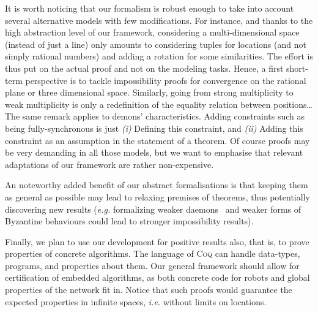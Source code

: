 \documentclass[11pt,a4]{llncs}
\newcommand{\x}{\xspace}
\newcommand{\coq}{\textsc{Coq}\x}
\begin{document}
It is worth noticing that our formalism is robust enough to take into
account several alternative models with few modifications.  For instance, and
thanks to the high abstraction level of our framework, considering a
multi-dimensional space (instead of just a line) only amounts to
considering tuples for locations (and not simply rational numbers) and
adding a rotation for some similarities. The effort is
thus put on the actual proof and not on the modeling tasks. Hence, a
first short-term perspective is to tackle impossibility proofs for convergence on
the rational plane or three dimensional space. Similarly, going from strong multiplicity to weak
multiplicity is only a redefinition of the equality relation between
positions\ldots The same remark applies to demons'
characteristics. Adding constraints such as being fully-synchronous is
just \emph{(i)} Defining this constraint, and \emph{(ii)} Adding this constraint as an
assumption in the statement of a theorem. Of course proofs may be very
demanding in all those models, but we want to emphasise that relevant
adaptations of our framework are rather non-expensive.

An noteworthy added benefit of our abstract formalisations is
that keeping them as general as possible may lead to relaxing premises
of theorems, thus potentially discovering new results (\emph{e.g.}
formalizing weaker daemons~\cite{DT11r} and weaker forms of Byzantine behaviours
could lead to stronger impossibility results).

Finally, we plan to use our development for positive results also,
that is, to prove properties of concrete algorithms. The language of
\coq can handle data-types, programs, and properties about them. Our
general framework should allow for certification of embedded
algorithms, as both concrete code for robots and global properties of
the network fit in. Notice that such proofs would
guarantee the expected properties in infinite spaces, \emph{i.e.} without
limits on locations.



\newpage



\end{document}
